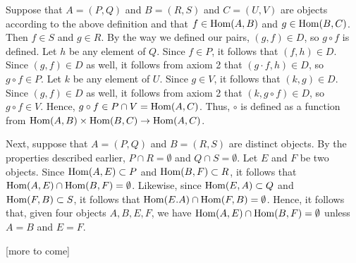 \documentclass[12pt]{article}
\begin{document}
Suppose that $A = (P,Q)$ and $B = (R,S)$ and $C = (U,V)$ are objects according 
to the above definition and that $f \in {\rm Hom} (A,B)$ and $g \in {\rm Hom} 
(B,C)$.  Then $f \in S$ and $g \in R$.  By the way we defined our pairs, $(g,f) 
\in D$, so $g \circ f$ is defined. Let $h$ be any element of $Q$.  Since 
$f \in P$, it follows that $(f,h) \in D$.  Since $(g,f) \in D$ as well, it follows
from axiom 2 that $(g \cdot f, h) \in D$, so $g \circ f\in P$.  Let $k$ be any
element of $U$.  Since $g \in V$, it follows that $(k,g) \in D$.  Since $(g,f) 
\in D$ as well, it follows from axiom 2 that $(k,g \circ f) \in D$, so $g \circ f
\in V$.  Hence, $g \circ f \in P \cap V = {\rm Hom} (A,C)$.  Thus, $\circ$ is 
defined as a function from ${\rm Hom} (A,B) \times {\rm Hom} (B,C) \to {\rm Hom} (A,C)$.

Next, suppose that $A = (P,Q)$ and $B = (R,S)$ are distinct objects.   By the
properties described earlier, $P \cap R = \emptyset$ and $Q \cap S = \emptyset$.
Let $E$ and $F$ be two objects.  Since ${\rm Hom} (A,E) \subset P$ and
${\rm Hom} (B,F) \subset R$, it follows that ${\rm Hom} (A,E) \cap {\rm Hom} (B,F)
= \emptyset$.  Likewise, since ${\rm Hom} (E,A) \subset Q$ and ${\rm Hom} (F,B) 
\subset S$, it follows that ${\rm Hom} (E.A) \cap {\rm Hom} (F,B) = \emptyset$.
Hence, it follows that, given four objects $A,B,E,F$, we have
${\rm Hom} (A,E) \cap {\rm Hom} (B,F) = \emptyset$ unless $A = B$ and $E = F$.

[more to come]


\end{document}
